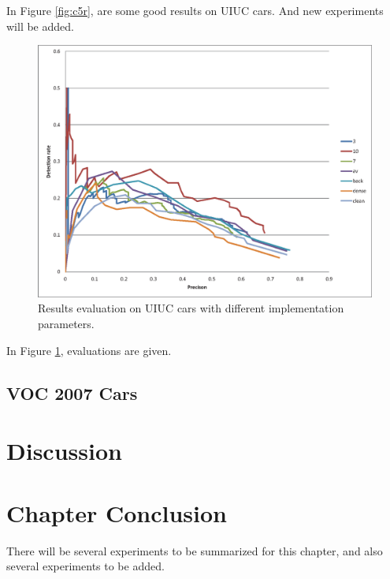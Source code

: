 In Figure \ref{fig:c5r}, are some good results on UIUC cars. And new experiments will be added.
\begin{figure}
\centering

\includegraphics[width=1\textwidth]{pms.eps}


\caption[Result evaluation]{Results evaluation on UIUC cars with different implementation parameters.}
\label{fig:c52}
\end{figure}

In Figure \ref{fig:c52}, evaluations are given.

\subsection{VOC 2007 Cars}

\section{Discussion}
\label{dis5}

\section{Chapter Conclusion}
\label{conc5}

There will be several experiments to be summarized for this chapter, and also several experiments to be added.
